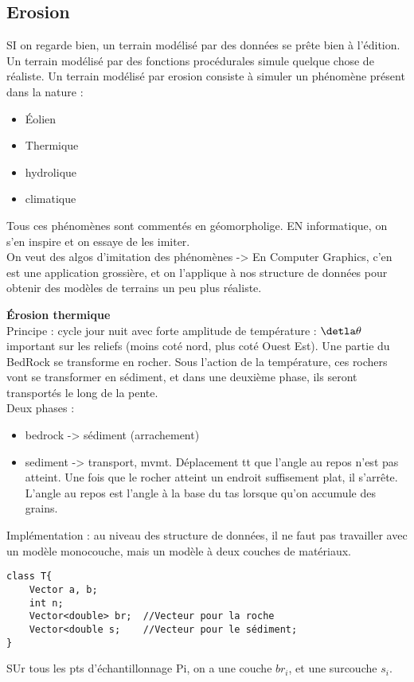 \documentclass[11pt]{article}
\begin{document}
{\subsection{Erosion}
SI on regarde bien, un terrain modélisé par des données se prête bien à l'édition. Un terrain modélisé par des fonctions procédurales simule quelque chose de réaliste. Un terrain modélisé par erosion consiste à simuler un phénomène présent dans la nature :
\begin{itemize}
	\item Éolien
	\item Thermique
	\item hydrolique
	\item climatique
\end{itemize}
Tous ces phénomènes sont commentés en géomorpholige. EN informatique, on s'en inspire et on essaye de les imiter. \\

On veut des algos d'imitation des phénomènes -> En Computer Graphics, c'en est une application grossière, et on l'applique à nos structure de données pour obtenir des modèles de terrains un peu plus réaliste.

\textbf{Érosion thermique}\\
Principe : cycle jour nuit avec forte amplitude de température : $\detla \theta$ important sur les reliefs (moins coté nord, plus coté Ouest Est). Une partie du BedRock se transforme en rocher. Sous l'action de la température, ces rochers vont se transformer en sédiment, et dans une deuxième phase, ils seront transportés le long de la pente.\\
Deux phases :
\begin{itemize}
	\item bedrock -> sédiment (arrachement)
	\item sediment -> transport, mvmt. Déplacement tt que l'angle au repos n'est pas atteint. Une fois que le rocher atteint un endroit suffisement plat, il s'arrête. L'angle au repos est l'angle à la base du tas lorsque qu'on accumule des grains.
\end{itemize}

Implémentation : au niveau des structure de données, il ne faut pas travailler avec un modèle monocouche, mais un modèle à deux couches de matériaux.

\begin{verbatim}
class T{
	Vector a, b;
	int n;
	Vector<double> br;	//Vecteur pour la roche
	Vector<double s;	//Vecteur pour le sédiment;
}
\end{verbatim}
SUr tous les pts d'échantillonnage Pi, on a une couche $br_i$, et une surcouche $s_i$.

}
\end{document}
